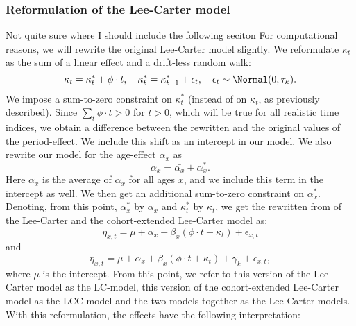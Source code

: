 \subsubsection{Reformulation of the Lee-Carter model}
\textcolor{myDarkGreen}{Not quite sure where I should include the following seciton}
For computational reasons, we will rewrite the original Lee-Carter model slightly. We reformulate $\kappa_t$ as the sum of a linear effect and a drift-less random walk:
\begin{equation}
    \kappa_t = \kappa_t^* + \phi\cdot t, \quad \kappa_t^* = \kappa_{t-1}^* + \epsilon_t, \quad \epsilon_t \sim \Normal(0,\tau_{\kappa}).
\end{equation}
We impose a sum-to-zero constraint on $\kappa_t^*$ (instead of on $\kappa_t$, as previously described). Since $\sum_t \phi \cdot t > 0$ for $t > 0$, which will be true for all realistic time indices, we obtain a difference between the rewritten and the original values of the period-effect. We include this shift as an intercept in our model. We also rewrite our model for the age-effect $\alpha_x$ as 
\begin{equation}
    \alpha_x = \bar{\alpha_x} + \alpha_x^*.
\end{equation}
Here $\bar{\alpha_x}$ is the average of $\alpha_x$ for all ages $x$, and we include this term in the intercept as well. We then get an additional sum-to-zero constraint on $\alpha_x^*$. Denoting, from this point, $\alpha_x^*$ by $\alpha_x$ and $\kappa_t^*$ by $\kappa_t$, we get the rewritten from of the Lee-Carter and the cohort-extended Lee-Carter model as:
\begin{equation}
    \eta_{x,t} = \mu + \alpha_x + \beta_x(\phi \cdot t + \kappa_t) + \epsilon_{x,t}
    \label{eq:LC-rewritten}
\end{equation}
and
\begin{equation}
    \eta_{x,t} = \mu + \alpha_x + \beta_x(\phi \cdot t + \kappa_t) + \gamma_k + \epsilon_{x,t},
    \label{eq:LCC-rewritten}
\end{equation}
where $\mu$ is the intercept. From this point, we refer to this version of the Lee-Carter model as the LC-model, this version of the cohort-extended Lee-Carter model as the LCC-model and the two models together as the Lee-Carter models. With this reformulation, the effects have the following interpretation:
